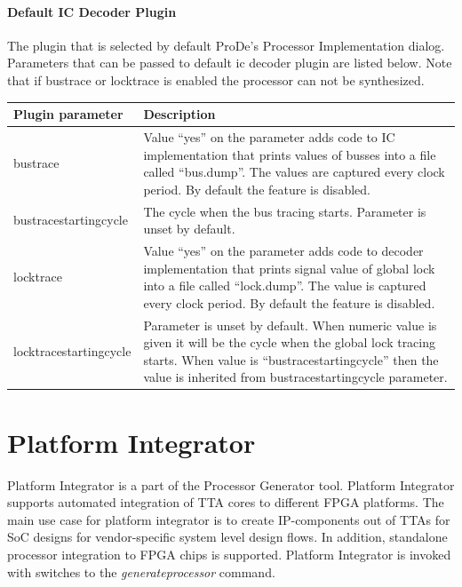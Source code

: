 \documentclass[twoside]{tceusermanual}
\begin{document}
\paragraph{Default IC Decoder Plugin}

The plugin that is selected by default  ProDe's Processor Implementation dialog. 
Parameters that can be passed to default ic decoder plugin are listed below. Note
that if bustrace or locktrace is enabled the processor can not be synthesized.

\begin{center}
\begin{longtable}[htb]{@{}p{}@{}p{}}
\textbf{Plugin parameter} &\textbf{Description} \\
\hline
bustrace &%
Value ``yes'' on the parameter adds code to IC implementation that 
prints values of busses into a file called ``bus.dump''. The values are
captured every clock period. By default the feature is disabled.
\\
bustracestartingcycle &%
The cycle when the bus tracing starts. Parameter is unset by default.
\\
locktrace &%
Value ``yes'' on the parameter adds code to decoder implementation that 
prints signal value of global lock into a file called ``lock.dump''. The
value is captured every clock period. By default the feature is disabled.
\\
locktracestartingcycle &%
Parameter is unset by default. When numeric value is given it will be
the cycle when the global lock tracing starts. When value is 
``bustracestartingcycle'' then the value is inherited from bustracestartingcycle
parameter.
\\


\end{longtable}
\end{center}

\section{Platform Integrator}
\label{sec:platformIntegrator}

Platform Integrator is a part of the Processor Generator tool. Platform
Integrator supports automated integration of TTA cores to different
FPGA platforms. The main use case for platform integrator is to
create IP-components out of TTAs for SoC designs for vendor-specific system
level design flows. In addition, standalone processor integration to FPGA
chips is supported. Platform Integrator is invoked
with switches to the \textit{generateprocessor} command.
\end{document}
